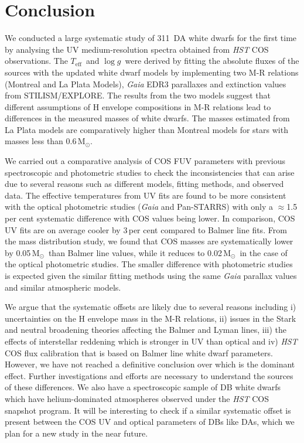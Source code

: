 \documentclass[fleqn,usenatbib, useAMS]{mnras}
\newcommand{\Teff}{\mbox{$T_{\mathrm{eff}}$}}
\newcommand{\logg}{\mbox{$\log g$}}
\newcommand{\Msun}{\mbox{$\mathrm{M_\odot}$}}
\newcommand{\totalnumber}{311}
\begin{document}
\section{Conclusion}\label{sec:conc}
We conducted a large systematic study of \totalnumber\ DA white dwarfs for the first time by analysing the UV medium-resolution spectra obtained from \textit{HST} COS observations. The \Teff\ and \logg\ were derived by fitting the absolute fluxes of the sources with the updated white dwarf models by implementing two M-R relations (Montreal and La Plata Models), \textit{Gaia} EDR3 parallaxes and extinction values from STILISM/EXPLORE. The results from the two models suggest that different assumptions of H envelope compositions in M-R relations lead to differences in the measured masses of white dwarfs. The masses estimated from La Plata models are comparatively higher than Montreal models for stars with masses less than 0.6\,\Msun.

We carried out a comparative analysis of COS FUV parameters with previous spectroscopic and photometric studies to check the inconsistencies that can arise due to several reasons such as different models, fitting methods, and observed data. The effective temperatures from UV fits are found to be more consistent with the optical photometric studies (\textit{Gaia} and Pan-STARRS) with only a $\approx$1.5\,per cent systematic difference with COS values being lower. In comparison, COS UV fits are on average cooler by 3\,per cent compared to Balmer line fits. From the mass distribution study, we found that COS masses are systematically lower by 0.05\,\Msun\ than Balmer line values, while it reduces to 0.02\,\Msun\ in the case of the optical photometric studies. The smaller difference with photometric studies is expected given the similar fitting methods using the same \textit{Gaia} parallax values and similar atmospheric models. 

We argue that the systematic offsets are likely due to several reasons including i) uncertainties on the H envelope mass in the M-R relations, ii) issues in the Stark and neutral broadening theories affecting the Balmer and Lyman lines, iii) the effects of interstellar reddening which is stronger in UV than optical and iv) \textit{HST} COS flux calibration that is based on Balmer line white dwarf parameters. However, we have not reached a definitive conclusion over which is the dominant effect. Further investigations and efforts are necessary to understand the sources of these differences. We also have a spectroscopic sample of DB white dwarfs which have helium-dominated atmospheres observed under the \textit{HST} COS snapshot program. It will be interesting to check if a similar systematic offset is present between the COS UV and optical parameters of DBs like DAs, which we plan for a new study in the near future. 
\end{document}
